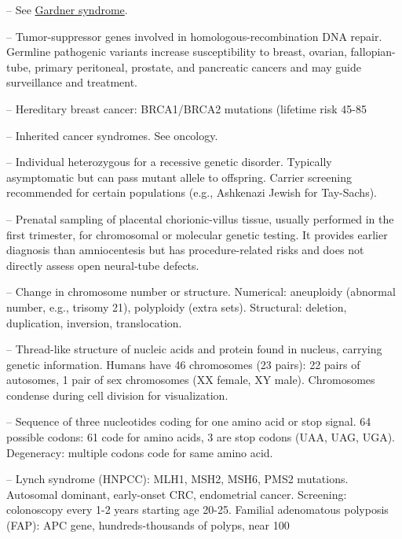 -- See \hyperlink{Gardner Syndrome}{Gardner syndrome}.

-- Tumor-suppressor genes involved in homologous-recombination DNA repair. Germline pathogenic variants increase susceptibility to breast, ovarian, fallopian-tube, primary peritoneal, prostate, and pancreatic cancers and may guide surveillance and treatment.

-- Hereditary breast cancer: BRCA1/BRCA2 mutations (lifetime risk 45-85%

-- Inherited cancer syndromes. See oncology.

-- Individual heterozygous for a recessive genetic disorder. Typically asymptomatic but can pass mutant allele to offspring. Carrier screening recommended for certain populations (e.g., Ashkenazi Jewish for Tay-Sachs).

-- Prenatal sampling of placental chorionic-villus tissue, usually performed in the first trimester, for chromosomal or molecular genetic testing. It provides earlier diagnosis than amniocentesis but has procedure-related risks and does not directly assess open neural-tube defects.

-- Change in chromosome number or structure. Numerical: aneuploidy (abnormal number, e.g., trisomy 21), polyploidy (extra sets). Structural: deletion, duplication, inversion, translocation.

-- Thread-like structure of nucleic acids and protein found in nucleus, carrying genetic information. Humans have 46 chromosomes (23 pairs): 22 pairs of autosomes, 1 pair of sex chromosomes (XX female, XY male). Chromosomes condense during cell division for visualization.

-- Sequence of three nucleotides coding for one amino acid or stop signal. 64 possible codons: 61 code for amino acids, 3 are stop codons (UAA, UAG, UGA). Degeneracy: multiple codons code for same amino acid.

-- Lynch syndrome (HNPCC): MLH1, MSH2, MSH6, PMS2 mutations. Autosomal dominant, early-onset CRC, endometrial cancer. Screening: colonoscopy every 1-2 years starting age 20-25. Familial adenomatous polyposis (FAP): APC gene, hundreds-thousands of polyps, near 100%

